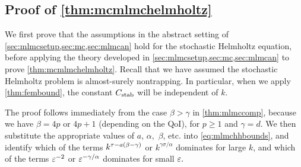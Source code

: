 \subsection{Proof of \cref{thm:mcmlmchelmholtz}}
We first prove that the assumptions in the abstract setting of \cref{sec:mlmcsetup,sec:mc,sec:mlmcan} hold for the stochastic Helmholtz equation, before applying the theory developed in \cref{sec:mlmcsetup,sec:mc,sec:mlmcan} to prove \cref{thm:mcmlmchelmholtz}. Recall that we have assumed the stochastic Helmholtz problem is almost-surely nontrapping. In particular, when we apply \cref{thm:fembound}, the constant $C_{\mathrm{stab}}$ will be independent of $k.$



\label{page:mcmlmchelmholtzproof}
The proof follows immediately from the case $\beta > \gamma$ in \cref{thm:mlmccomp}, because we have $\beta = 4p$ or $4p+1$  (depending on the QoI), for $p\geq 1$ and $\gamma=d.$ We then substitute the appropriate values of $a$, $\alpha,$ $\beta$, etc. into \cref{eq:mlmchhbounds}, and identify which of the terms $k^{\tau - a\mleft(\beta-\gamma\mright)}$ or $k^{\gamma\sigma/\alpha}$ dominates for large $k$, and which of the terms $\varepsilon^{-2}$ or $\varepsilon^{-\gamma/\alpha}$ dominates for small $\varepsilon.$

